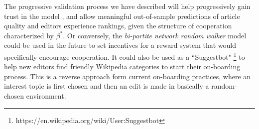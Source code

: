 The progressive validation process we have described will help progressively gain trust in the model \cite{sornette2007}, and allow meaningful out-of-sample predictions of article quality and editors experience rankings, given the structure of cooperation characterized by $\beta^{*}$. Or conversely, the {\it bi-partite network random walker} model could be used in the future to set incentives for a reward system that would specifically encourage cooperation. It could also be used as a ``Suggestbot" \footnote{https://en.wikipedia.org/wiki/User:Suggestbot} to help new editors find friendly Wikipedia categories to start their on-boarding process. This is a reverse approach form current on-boarding practices, where an interest topic is first chosen and then an edit is made in basically a random-chosen environment.



